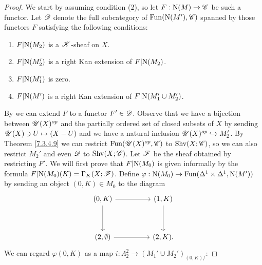 \documentclass[../thesis.tex]{subfiles}
\begin{document}
\begin{proof}
    We start by assuming condition (2), so let $F: \mathrm{N}(M) \to \mathscr{C}$ be such a functor.
    Let $\mathscr{D}$ denote the full subcategory of $\mathrm{Fun}(\mathrm{N}(M'), \mathscr{C})$ spanned by those functors $F$ satisfying the following conditions:
    \begin{enumerate}
        \item $F|\mathrm{N}(M_2)$ is a $\mathscr{K}$-sheaf on $X$.
        \item $F|\mathrm{N}(M'_2)$ is a right Kan extension of $F|\mathrm{N}(M_2)$.
        \item $F|\mathrm{N}(M'_1)$ is zero.
        \item $F|\mathrm{N}(M')$ is a right Kan extension of $F|\mathrm{N}(M'_1 \cup M'_2)$.
    \end{enumerate}
    By \cite[Proposition 4.3.2.15]{HTT} we can extend $F$ to a functor $F' \in \mathscr{D}$.
    Observe that we have a bijection between $\mathscr{U}(X)^{op}$ and the partially ordered set of closed subsets of $X$ by sending $\mathscr{U}(X) \ni U \mapsto (X - U)$ and we have a natural inclusion $\mathscr{U}(X)^{op} \hookrightarrow M_2'$.
    By Theorem \ref{7.3.4.9} we can restrict $\mathrm{Fun}(\mathscr{U}(X)^{op}, \mathscr{C})$ to $\mathrm{Shv}(X;\mathscr{C})$, so we can also restrict $M_2'$ and even $\mathscr{D}$ to $\mathrm{Shv}(X;\mathscr{C})$.
    Let $\mathscr{F}$ be the sheaf obtained by restricting $F'$. We will first prove that $F|\mathrm{N}(M_0)$ is given informally by the formula $F|\mathrm{N}(M_0)(K)=\Gamma_K(X;\mathscr{F})$.
    Define $\varphi:\mathrm{N}(M_0) \to \mathrm{Fun}(\Delta^1\times \Delta^1, \mathrm{N}(M'))$ by sending an object $(0,K) \in M_0$ to the diagram
    \[\begin{tikzcd}
            {(0,K)} && {(1,K)} \\
            \\
            {(2,\emptyset)} && {(2,K)}
            \arrow[from=1-1, to=1-3]
            \arrow[from=1-3, to=3-3]
            \arrow[from=3-1, to=3-3]
            \arrow[from=1-1, to=3-1].
        \end{tikzcd}\]
    We can regard $\varphi(0,K)$ as a map $i: \Lambda_2^2 \to (M_1'\cup M_2')_{(0,K)/}$:

\end{proof}
\end{document}
